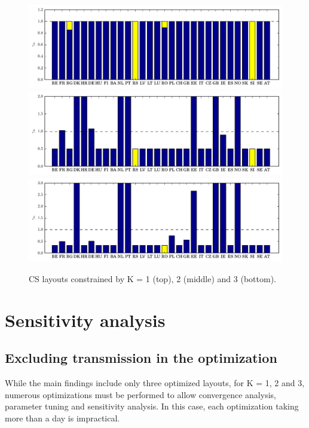 \documentclass[a4paper, 12pt, sort&compress]{elsarticle}%
\newcommand{\chromowidth}{1.05 \columnwidth}
\begin{document}
\begin{figure}
  \centering
  \includegraphics[width = \chromowidth, center]{VE50cuckooK=1@TRANS10k}
  \includegraphics[width = \chromowidth, center]{VE50cuckooK=2@TRANS10k}
  \includegraphics[width = \chromowidth, center]{VE50cuckooK=3@TRANS10k}
  \caption{CS layouts constrained by K = 1 (top), 2 (middle) and 3
    (bottom). }
  \label{fig:optimized}
\end{figure}

\section{Sensitivity analysis}
\label{sec:sensitivity-analysis}

\subsection{Excluding transmission in the optimization}
\label{sec:incl-transm-optim}

While the main findings include only three optimized layouts, for K =
1, 2 and 3, numerous optimizations must be performed to allow
convergence analysis, parameter tuning and sensitivity analysis. In
this case, each optimization taking more than a day is impractical. 
\end{document}
